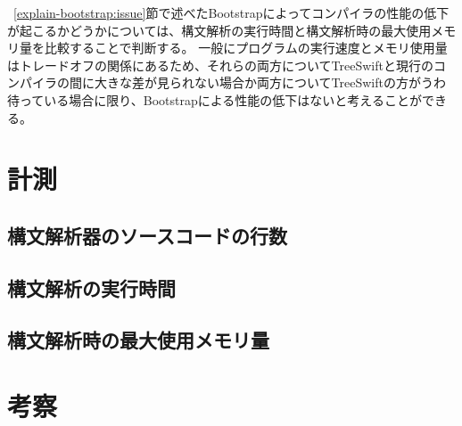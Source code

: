 ~\ref{explain-bootstrap:issue}節で述べたBootstrapによってコンパイラの性能の低下が起こるかどうかについては、構文解析の実行時間と構文解析時の最大使用メモリ量を比較することで判断する。
一般にプログラムの実行速度とメモリ使用量はトレードオフの関係にあるため、それらの両方についてTreeSwiftと現行のコンパイラの間に大きな差が見られない場合か両方についてTreeSwiftの方がうわ待っている場合に限り、Bootstrapによる性能の低下はないと考えることができる。


\section{計測}

\subsection{構文解析器のソースコードの行数}

\subsection{構文解析の実行時間}

\subsection{構文解析時の最大使用メモリ量}

\section{考察}

